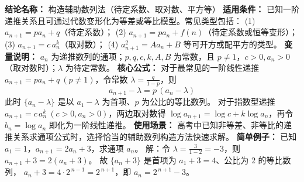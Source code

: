 \textbf{结论名称：} 构造辅助数列法（待定系数、取对数、平方等）  
\textbf{适用条件：} 已知一阶递推关系且可通过代数变形化为等差或等比模型。常见类型包括：
(1) \(a_{n+1}=pa_n+q\)（待定系数）；
(2) \(a_{n+1}=pa_n+f(n)\)（待定系数或恒等变形）；
(3) \(a_{n+1}=c\,a_n^k\)（取对数）；
(4) \(a_{n+1}^2=A a_n + B\) 等可开方或配平方的类型。  
\textbf{变量说明：} \(a_n\) 为递推数列的通项；\(p, q, c, k, A, B\) 为常数，且 \(p \neq 1\)，\(c>0, a_n>0\)（取对数时）；\(\lambda\) 为待定常数。  
\textbf{核心公式：}
对于最常见的一阶线性递推 \(a_{n+1}=pa_n+q\ (p \neq 1)\)，令常数 \(\lambda = \frac{q}{1-p}\)，则
\[ \boxed{a_{n+1}-\lambda = p\,(a_n-\lambda)} \]
此时 \(\{a_n-\lambda\}\) 是以 \(a_1-\lambda\) 为首项、\(p\) 为公比的等比数列。  
对于指数型递推 \(a_{n+1}=c\,a_n^k\ (c>0,a_n>0)\)，两边取对数得 \(\log a_{n+1} = \log c + k \log a_n\)，再令 \(b_n=\log a_n\) 即化为一阶线性递推。  
\textbf{使用场景：} 高考中已知非等差、非等比的递推关系求通项公式时，选择恰当的辅助数列构造方法快速求解。  
\textbf{简单例子：}
已知 \(a_1=1\)，\(a_{n+1}=2a_n+3\)，求通项 \(a_n\)。  
解：令 \(\lambda = \frac{3}{1-2} = -3\)，则 \(a_{n+1}+3 = 2(a_n+3)\)。  
故 \(\{a_n+3\}\) 是首项为 \(a_1+3=4\)、公比为 \(2\) 的等比数列，  
\(a_n+3 = 4 \cdot 2^{\,n-1} = 2^{\,n+1}\)，即 \(a_n = 2^{\,n+1}-3\)。
